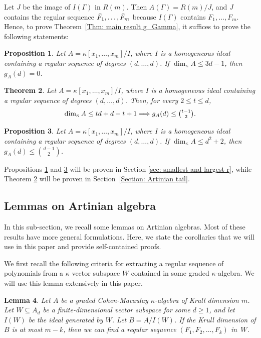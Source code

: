 \documentclass[11pt]{amsart}
\newtheorem{theorem}{Theorem}[section]
\newtheorem{proposition}[theorem]{Proposition}
\newtheorem{lemma}[theorem]{Lemma}
\theoremstyle{definition}
\newcommand{\Fb}{\Bar{F}}
\newcommand{\dimk}{\dim_{\kappa}}
\newcommand{\ka}{\kappa}
\begin{document}
Let $J$ be the image of $I(\Gamma)$ in $R(m)$.
Then $A(\Gamma)=R(m)/J$, and $J$ contains
the regular sequence $\Fb_1,\ldots,\Fb_m$ because
$I(\Gamma)$ contains $F_1,\ldots,F_m$. Hence, to prove Theorem~\ref{Thm: main result g_Gamma}, it suffices to prove the following statements:
\begin{proposition}\label{Prop: algebra reg seq 3d-1}
Let $A=\kappa[x_1,\ldots,x_m]/I$, where $I$ is a homogeneous
ideal containing a regular sequence of degrees $(d,\ldots,d)$.
If $\dim_\kappa A\leq 3d-1$, then $g_A(d)=0$.
\end{proposition}
\begin{theorem}\label{thm: main inequality}
Let $A=\kappa[x_1,\ldots,x_m]/I$, where $I$ is a homogeneous
ideal containing a regular sequence of degrees $(d,\ldots,d)$.
Then, for every $2\leq t\leq d$,
\begin{equation}\label{eq: main inequality}
\dim_\kappa A\leq td+d-t+1
\Longrightarrow
g_A(d)\leq \tbinom{t-1}{2}.
\end{equation}
\end{theorem}
\begin{proposition}\label{prop: end bound}
    Let $A=\kappa[x_1,\ldots,x_m]/I$, where $I$ is a homogeneous
ideal containing a regular sequence of degrees $(d,\ldots,d)$. If $\dimk A \leq d^2+2$, then $g_A(d) \leq \binom{d-1}{2}$.
\end{proposition}
Propositions \ref{Prop: algebra reg seq 3d-1} and \ref{prop: end bound}  will be proven in Section \ref{sec: smallest and largest r}, while Theorem \ref{thm: main inequality} will be proven in Section~\ref{Section: Artinian tail}.


\subsection{Lemmas on Artinian algebra}\label{Section: hilbert function}
In this sub-section, we recall some lemmas on Artinian algebras. Most of these results have more general formulations. Here, we state the corollaries that we will use in this paper and provide self-contained proofs.


We first recall the following criteria for extracting a regular sequence of polynomials from a $\kappa$ vector subspace $W$ contained in some graded $\kappa$-algebra. We will use this lemma extensively in this paper.
\begin{lemma}\cite[Lemma 2.1]{lin2026k}\label{lem: regular sequence Krull dimension}
Let $A$ be a graded Cohen-Macaulay $\ka$-algebra of Krull dimension $m$. 
Let $W\subseteq A_d$ be a
finite-dimensional vector subspace for some $d\geq 1$, and let $I(W)$ be the ideal generated by $W$. Let $B=A/I(W)$. If the Krull dimension of $B$ is at most $m-k$, then we can find a regular sequence $(F_1,F_2, \dots, F_{k})$ in~$W$.
\end{lemma}
\end{document}
